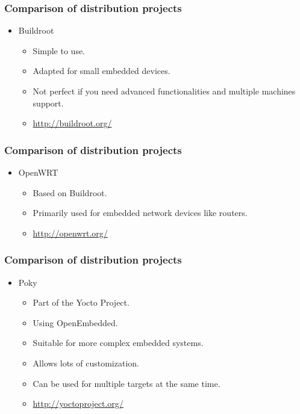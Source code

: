 \begin{frame}
  \frametitle{Comparison of distribution projects}
  \begin{itemize}
  \item Buildroot
    \begin{itemize}
      \item Simple to use.
      \item Adapted for small embedded devices.
      \item Not perfect if you need advanced functionalities and
            multiple machines support.
      \item \url{http://buildroot.org/}
    \end{itemize}
  \end{itemize}
\end{frame}

\begin{frame}
  \frametitle{Comparison of distribution projects}
  \begin{itemize}
  \item OpenWRT
    \begin{itemize}
      \item Based on Buildroot.
      \item Primarily used for embedded network devices like routers.
      \item \url{http://openwrt.org/}
    \end{itemize}
  \end{itemize}
\end{frame}

\begin{frame}
  \frametitle{Comparison of distribution projects}
  \begin{itemize}
  \item Poky
    \begin{itemize}
      \item Part of the Yocto Project.
      \item Using OpenEmbedded.
      \item Suitable for more complex embedded systems.
      \item Allows lots of customization.
      \item Can be used for multiple targets at the same time.
      \item \url{http://yoctoproject.org/}
    \end{itemize}
  \end{itemize}
\end{frame}


